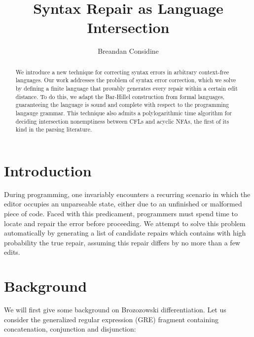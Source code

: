 \documentclass[sigplan,review,acmsmall,nonacm,screen,anonymous]{acmart}\settopmatter{printfolios=false,printccs=false,printacmref=false}
\begin{document}
%
\title{Syntax Repair as Language Intersection}
%
\begin{abstract}
  We introduce a new technique for correcting syntax errors in arbitrary context-free languages. Our work addresses the problem of syntax error correction, which we solve by defining a finite language that provably generates every repair within a certain edit distance. To do this, we adapt the Bar-Hillel construction from formal languages, guaranteeing the language is sound and complete with respect to the programming langauge grammar. This technique also admits a polylogarithmic time algorithm for deciding intersection nonemptiness between CFLs and acyclic NFAs, the first of its kind in the parsing literature.
\end{abstract}

  \author{Breandan Considine}

  \maketitle

  \section{Introduction}

  During programming, one invariably encounters a recurring scenario in which the editor occupies an unparseable state, either due to an unfinished or malformed piece of code. Faced with this predicament, programmers must spend time to locate and repair the error before proceeding. We attempt to solve this problem automatically by generating a list of candidate repairs which contains with high probability the true repair, assuming this repair differs by no more than a few edits.

  \section{Background}

  We will first give some background on Brozozowski differentiation. Let us consider the generalized regular expression (GRE) fragment containing concatenation, conjunction and disjunction:
\end{document}
